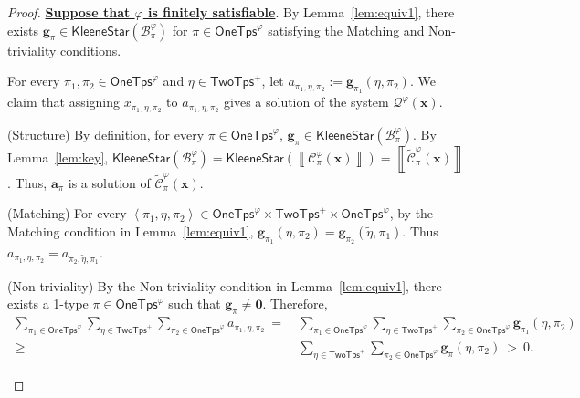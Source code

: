 \documentclass[10pt,a4paper]{article}
\theoremstyle{definition}
\theoremstyle{remark}
\newcommand{\cB}{\mathcal{B}}
\newcommand{\cC}{\mathcal{C}}
\newcommand{\cCtilde}{\tilde{\mathcal{C}}}
\newcommand{\cQ}{\mathcal{Q}}
\newcommand{\bfa}{\mathbf{a}}
\newcommand{\bfg}{\mathbf{g}}
\newcommand{\bfx}{\mathbf{x}}
\newcommand{\bfzero}{\mathbf{0}}
\newcommand{\twotypes}{\mathsf{TwoTps}}
\newcommand{\Onetypes}{\mathsf{OneTps}}
\newcommand{\tuple}[1]       {\left\langle #1 \right\rangle}
\newcommand{\dual}[1] {\widetilde{ #1 }}
\newcommand{\kstar}[1] {\mathsf{KleeneStar}\left( #1 \right)}
\newcommand{\sol}[1] {\left\llbracket #1 \right\rrbracket}
\begin{document}
\begin{proof}
    \textbf{\uline{Suppose that $\varphi$ is finitely satisfiable}}.
    By Lemma~\ref{lem:equiv1},
    there exists $\bfg_\pi \in \kstar{\cB^\varphi_\pi}$ for $\pi \in \Onetypes^\varphi$
    satisfying the Matching and Non-triviality conditions.

    For every $\pi_1, \pi_2 \in \Onetypes^\varphi$ and $\eta \in \twotypes^+$,
    let
    $a_{\pi_1, \eta, \pi_2} := \bfg_{\pi_1}(\eta, \pi_2)$.
    We claim that assigning  $x_{\pi_1, \eta, \pi_2}$ to $a_{\pi_1, \eta, \pi_2}$ gives a solution of the system $\cQ^\varphi(\bfx)$.
    \begin{compactitem}
        \item (Structure)
        By definition, for every $\pi \in \Onetypes^\varphi$,
        $\bfg_\pi \in \kstar{\cB^\varphi_\pi}$.
        By Lemma~\ref{lem:key},
        $\kstar{\cB^\varphi_\pi}
        = \kstar{\sol{\cC^\varphi_\pi(\bfx)}}
        = \sol{\cCtilde^\varphi_\pi(\bfx)}$.
        Thus, $\bfa_\pi$ is a solution of $\cCtilde^\varphi_\pi(\bfx)$.
        
        \item (Matching) For every $\tuple{\pi_1, \eta, \pi_2} \in \Onetypes^\varphi \times \twotypes^+ \times \Onetypes^\varphi$,
        by the Matching condition in Lemma~\ref{lem:equiv1},
        $\bfg_{\pi_1}(\eta, \pi_2) = \bfg_{\pi_2}(\dual{\eta}, \pi_1)$.
        Thus $a_{\pi_1, \eta, \pi_2} = a_{\pi_2, \dual{\eta}, \pi_1}$.

        \item (Non-triviality) By the Non-triviality condition in Lemma~\ref{lem:equiv1},
        there exists a 1-type $\pi \in \Onetypes^\varphi$
        such that $\bfg_\pi \neq \bfzero$.
        Therefore, 
        \begin{equation*}
            \begin{aligned}
                \sum_{\pi_1 \in \Onetypes^\varphi}
                \sum_{\eta \in \twotypes^+}\sum_{\pi_2 \in \Onetypes^\varphi} a_{\pi_1, \eta, \pi_2}
                \ =\ &
                \sum_{\pi_1 \in \Onetypes^\varphi}
                \sum_{\eta \in \twotypes^+}\sum_{\pi_2 \in \Onetypes^\varphi} \bfg_{\pi_1}(\eta, \pi_2) \\
                \ \ge\ &
                \sum_{\eta \in \twotypes^+}\sum_{\pi_2 \in \Onetypes^\varphi} \bfg_{\pi}(\eta, \pi_2) 
                \ >\ 0.
            \end{aligned}
        \end{equation*}
    \end{compactitem}


\end{proof}
\end{document}
